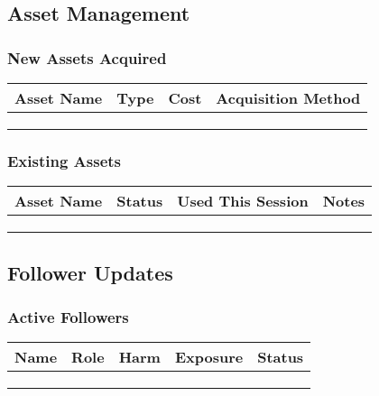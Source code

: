 \subsection{Asset Management}

\subsubsection{New Assets Acquired}
\begin{tabular}{|p{3cm}|p{2cm}|p{2cm}|p{3cm}|}
\hline
\textbf{Asset Name} & \textbf{Type} & \textbf{Cost} & \textbf{Acquisition Method} \\
\hline
& & & \\
& & & \\
& & & \\
\hline
\end{tabular}

\subsubsection{Existing Assets}
\begin{tabular}{|p{4cm}|p{2cm}|p{2cm}|p{2cm}|}
\hline
\textbf{Asset Name} & \textbf{Status} & \textbf{Used This Session} & \textbf{Notes} \\
\hline
& & & \\
& & & \\
& & & \\
\hline
\end{tabular}

\subsection{Follower Updates}

\subsubsection{Active Followers}
\begin{tabular}{|p{3cm}|p{2cm}|p{1.5cm}|p{1.5cm}|p{2cm}|}
\hline
\textbf{Name} & \textbf{Role} & \textbf{Harm} & \textbf{Exposure} & \textbf{Status} \\
\hline
& & & & \\
& & & & \\
& & & & \\
\hline
\end{tabular}

